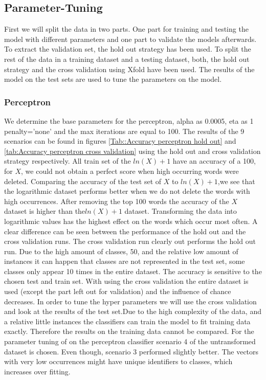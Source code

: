 \documentclass[11pt]{article}
\begin{document}
\subsection{Parameter-Tuning}
First we will split the data in two parts. One part for training and testing the model with different parameters and one part to validate the models afterwards. To extract the validation set, the hold out strategy has been used.
\newline
To split the rest of the data in a training dataset and a testing dataset, both, the hold out strategy and the cross validation using Xfold have been used. The results of the model on the test sets are used to tune the parameters on the model.

\subsubsection{Perceptron}
We determine the base parameters for the perceptron, alpha as 0.0005, eta as 1 penalty='none' and the max iterations are equal to 100. 
\newline
The results of the 9 scenarios can be found in figures  \ref{Tab::Accuracy perceptron hold out} and \ref{tab:Accuracy perceptron cross validation} using the hold out and cross validation strategy respectively.
All train set of the $ln(X)+1$ have an accuracy of a 100, for $X$, we could not obtain a perfect score when high occurring words were deleted. 
Comparing the accuracy of the test set of $X$ to $ln(X)+1$,we see that the logarithmic dataset performs better when we do not delete the words with high occurrences. After removing the top 100 words the accuracy of the $X$ dataset is higher than the$ln(X)+1$ dataset. Transforming the data into logarithmic values has the highest effect on the words which occur most often.
\newline
A clear difference can be seen between the performance of the hold out and the cross validation runs. The cross validation run clearly out performs the hold out run. Due to the high amount of classes, 50, and the relative low amount of instances it can happen that classes are not represented in the test set, some classes only appear 10 times in the entire dataset. The accuracy is sensitive to the chosen test and train set. With using the cross validation the entire dataset is used (except the part left out for validation) and the influence of chance decreases. In order to tune the hyper parameters we will use the cross validation and look at the results of the test set.Due to the high complexity of the data, and a relative little instances the classifiers can train the model to fit training data exactly. Therefore the results on the training data cannot be compared. 
\newline
For the parameter tuning of on the perceptron classifier scenario 4 of the untransformed dataset is chosen. Even though, scenario 3 performed slightly better. The vectors with very low occurrences might have unique identifiers to classes, which increases over fitting. 
\end{document}
